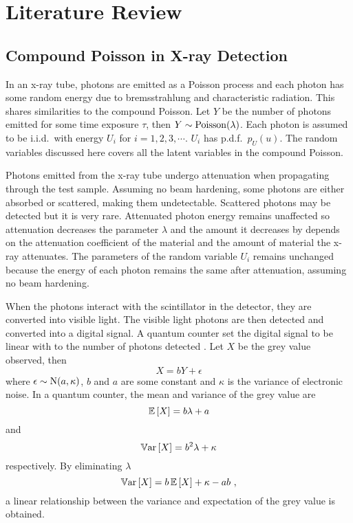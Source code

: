 \section{Literature Review}

\subsection{Compound Poisson in X-ray Detection}

In an x-ray tube, photons are emitted as a Poisson process and each photon has some random energy due to bremsstrahlung and characteristic radiation. This shares similarities to the compound Poisson. Let $Y$ be the number of photons emitted for some time exposure $\tau$, then $Y\sim\operatorname{Poisson}(\lambda)$. Each photon is assumed to be i.i.d.~with energy $U_i$ for $i=1,2,3,\cdots$. $U_i$ has p.d.f.~$p_U(u)$. The random variables discussed here covers all the latent variables in the compound Poisson.

Photons emitted from the x-ray tube undergo attenuation when propagating through the test sample. Assuming no beam hardening, some photons are either absorbed or scattered, making them undetectable. Scattered photons may be detected but it is very rare. Attenuated photon energy remains unaffected so attenuation decreases the parameter $\lambda$ and the amount it decreases by depends on the attenuation coefficient of the material and the amount of material the x-ray attenuates. The parameters of the random variable $U_i$ remains unchanged because the energy of each photon remains the same after attenuation, assuming no beam hardening.

When the photons interact with the scintillator in the detector, they are converted into visible light. The visible light photons are then detected and converted into a digital signal. A quantum counter set the digital signal to be linear with to the number of photons detected \citep{whiting2006properties}. Let $X$ be the grey value observed, then
\begin{equation}
X = bY + \epsilon
\end{equation}
where $\epsilon\sim\operatorname{N}(a,\kappa)$, $b$ and $a$ are some constant and $\kappa$ is the variance of electronic noise. In a quantum counter, the mean and variance of the grey value are
\begin{equation}
\operatorname{\mathbb{E}}\left[X\right] = b\lambda + a
\end{equation}
and
\begin{equation}
\operatorname{\mathbb{V}ar}\left[X\right] = b^2\lambda + \kappa
\end{equation}
respectively. By eliminating $\lambda$
\begin{equation}
\operatorname{\mathbb{V}ar}\left[X\right] = b\operatorname{\mathbb{E}}\left[X\right]+\kappa-ab \ ,
\end{equation}
a linear relationship between the variance and expectation of the grey value is obtained.

